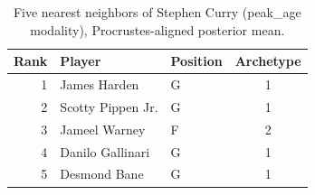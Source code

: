 \begin{table}[htbp]
  \centering\small
  \begin{tabular}{rllc}
    \toprule
    Rank & Player & Position & Archetype \\
    \midrule
    1 & James Harden & G & 1 \\
    2 & Scotty Pippen Jr. & G & 1 \\
    3 & Jameel Warney & F & 2 \\
    4 & Danilo Gallinari & G & 1 \\
    5 & Desmond Bane & G & 1 \\
    \bottomrule
  \end{tabular}
  \caption{Five nearest neighbors of Stephen Curry (peak_age modality), Procrustes-aligned posterior mean.}
  \label{tab:Stephen_Curry_neighbors_peak_age}
\end{table}

